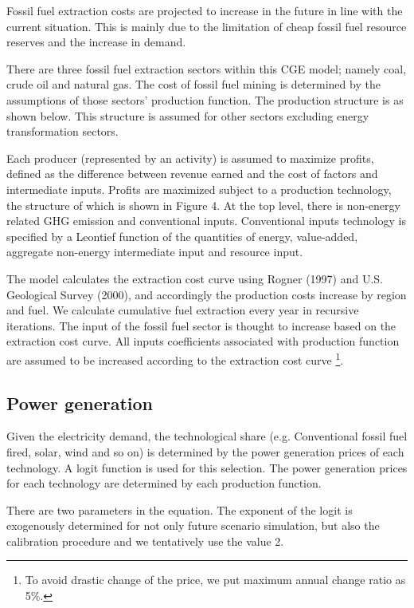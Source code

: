 \documentclass[10pt,a4paper,titlepage,dvipdfmx]{book}
\begin{document}
\begin{itemize}
Fossil fuel extraction costs are projected to increase in the future in line with the current situation. This is mainly due to the limitation of cheap fossil fuel resource reserves and the increase in demand.

There are three fossil fuel extraction sectors within this CGE model; namely coal, crude oil and natural gas. The cost of fossil fuel mining is determined by the assumptions of those sectors' production function. The production structure is as shown below. This structure is assumed for other sectors excluding energy transformation sectors.

Each producer (represented by an activity) is assumed to maximize profits, defined as the difference between revenue earned and the cost of factors and intermediate inputs. Profits are maximized subject to a production technology, the structure of which is shown in Figure 4. At the top level, there is non-energy related GHG emission and conventional inputs. Conventional inputs technology is specified by a Leontief function of the quantities of energy, value-added, aggregate non-energy intermediate input and resource input.

The model calculates the extraction cost curve using Rogner (1997) and U.S. Geological Survey (2000), and accordingly the production costs increase by region and fuel. We calculate cumulative fuel extraction every year in recursive iterations. The input of the fossil fuel sector is thought to increase based on the extraction cost curve. All inputs coefficients associated with production function are assumed to be increased according to the extraction cost curve \footnote{To avoid drastic change of the price, we put maximum annual change ratio as 5\%.}. 

\subsection{\label{subsec:FosFueExt-PowGen}Power generation}

Given the electricity demand, the technological share (e.g. Conventional fossil fuel fired, solar, wind and so on) is determined by the power generation prices of each technology. A logit function is used for this selection. The power generation prices for each technology are determined by each production function.

There are two parameters in the equation. The exponent of the logit is exogenously determined for not only future scenario simulation, but also the calibration procedure and we tentatively use the value 2.


\end{itemize}
\end{document}
